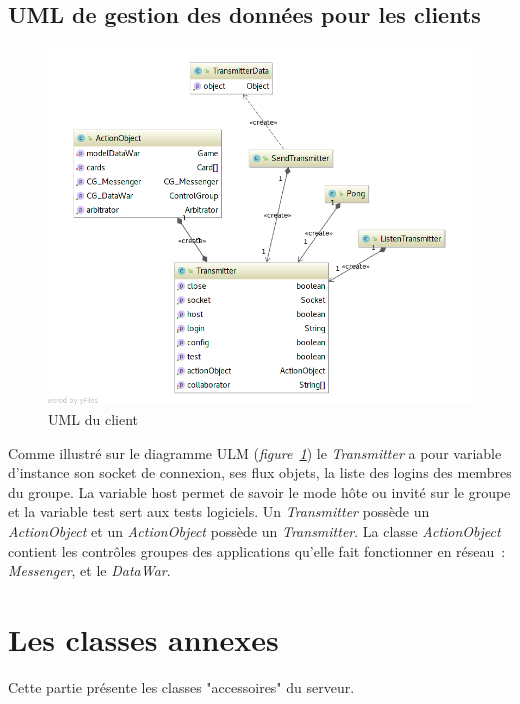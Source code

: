 \documentclass[a4paper,11pt]{report}
\begin{document}
\subsection{UML de gestion des données pour les clients}
 \begin{figure}[th]
      \begin{center}
        \includegraphics[scale=0.3]{Assets/UML_client.png}
        \caption{UML du client}
        \label{UML du client}
      \end{center}
    \end{figure}
    
  Comme illustré sur le diagramme ULM (\textit{figure~\ref{UML du client}}) le \textit{Transmitter} a pour variable d’instance son socket de connexion, ses flux objets, la liste des logins des membres du groupe. La variable host permet de savoir le mode hôte ou invité sur le groupe et la variable test sert aux tests logiciels. Un \textit{Transmitter} possède un \textit{ActionObject} et un \textit{ActionObject} possède un \textit{Transmitter}. La classe \textit{ActionObject} contient les contrôles groupes des applications qu’elle fait fonctionner en réseau : \textit{Messenger}, et le \textit{DataWar}.



\section{Les classes annexes}

Cette partie présente les classes "accessoires" du serveur.
\end{document}
